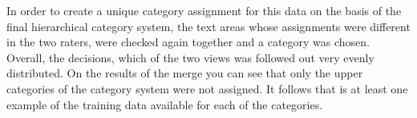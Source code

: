 \documentclass[11pt,a4paper]{article}
\begin{document}

In order to create a unique category assignment for this data on the basis of the final hierarchical category system, the text areas whose assignments were different in the two raters, were checked again together and a category was chosen. Overall, the decisions, which of the two views was followed out very evenly distributed. On the results of the merge you can see that only the upper categories of the category system were not assigned. It follows that is at least one example of the training data available for each of the categories.

\end{document}
